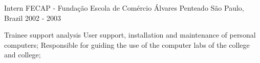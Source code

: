 \begin{cventries}
  \cventry
    {Intern} %
    {FECAP - Fundação Escola de Comércio Álvares Penteado} %
    {São Paulo, Brazil} %
    {2002 - 2003} %
    {
      \begin{cvitems} %
        \item {Trainee support analysis
User support, installation and maintenance of personal computers;
Responsible for guiding the use of the computer labs of the college and college;}
      \end{cvitems}
    }

\end{cventries}
